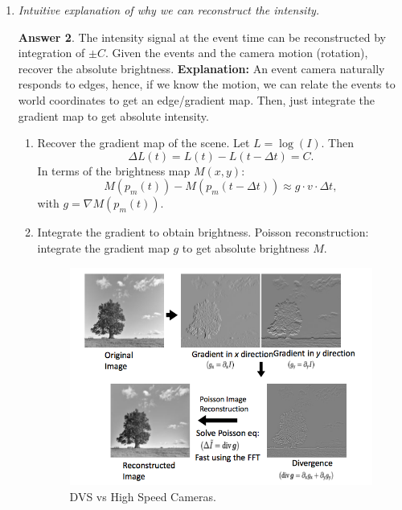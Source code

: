 \documentclass[a4paper,12 pt]{article}
\theoremstyle{definition}
\theoremstyle{remark}
\theoremstyle{definition}
\theoremstyle{definition}
\theoremstyle{definition}
\theoremstyle{definition}
\theoremstyle{remark}
\theoremstyle{remark}
\theoremstyle{definition}
\theoremstyle{definition}
\newtheorem*{answer}{Answer}
\begin{document}
\begin{enumerate}
\begin{answer}
\end{answer}
\item \textit{Intuitive explanation of why we can reconstruct the intensity. }
\begin{answer}
The intensity signal at the event time can be reconstructed by integration of $\pm C$. Given the events and the camera motion (rotation), recover the absolute brightness. \textbf{Explanation:} An event camera naturally responds to edges, hence, if we know the motion, we can relate the events to world coordinates to get an edge/gradient map. Then, just integrate the gradient map to get absolute intensity.
\begin{enumerate}
\item Recover the gradient map of the scene. Let $L=\log(I)$. Then
\begin{equation}
\Delta L(t)=L(t)-L(t-\Delta t)=C.
\end{equation}
In terms of the brightness map $M(x,y)$:
\begin{equation}
M(p_m(t))-M(p_m(t-\Delta t))\approx g\cdot v\cdot \Delta t,
\end{equation}
with $g=\nabla M(p_m(t))$.
\item Integrate the gradient to obtain brightness. Poisson reconstruction: integrate the gradient map $g$ to get absolute brightness $M$.
\begin{figure}[tbh]
\begin{center}
\includegraphics[scale=0.6]{pics/poisson}
\caption{DVS vs High Speed Cameras.}
\end{center}
\end{figure}
\end{enumerate}

\end{answer}
\end{enumerate}
\end{document}
